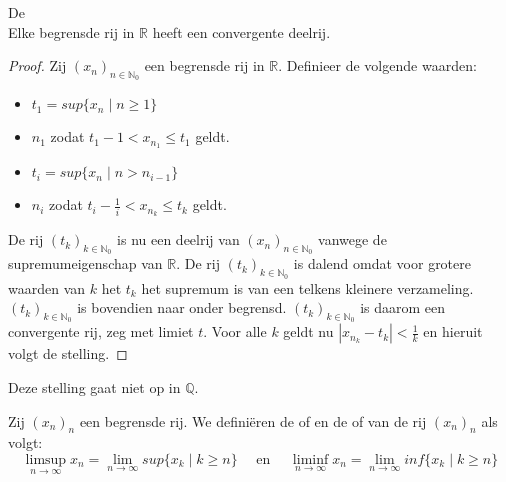 \documentclass[main.tex]{subfiles}
\begin{document}
\begin{bst}
  \label{st:bolzano-rijen}
  De \\
  Elke begrensde rij in $\mathbb{R}$ heeft een convergente deelrij.

  \begin{proof}
    Zij $(x_{n})_{n\in\mathbb{N}_{0}}$ een begrensde rij in $\mathbb{R}$.
    Definieer de volgende waarden:
    \begin{itemize}
    \item $t_{1} = sup\{ x_{n} \mid n \ge 1 \}$
    \item $n_{1}$ zodat $t_1-1 < x_{n_{1}} \le t_{1}$ geldt.
    \item $t_{i} = sup\{ x_{n} \mid n > n_{i-1} \}$
    \item $n_{i}$ zodat $t_{i}-\frac{1}{i} < x_{n_{k}} \le t_{k}$ geldt.
    \end{itemize}
    De rij $(t_{k})_{k\in \mathbb{N}_{0}}$ is nu een deelrij van $(x_{n})_{n\in\mathbb{N}_{0}}$ vanwege de supremumeigenschap van $\mathbb{R}$.\needed
    De rij $(t_{k})_{k\in \mathbb{N}_{0}}$ is dalend omdat voor grotere waarden van $k$ het $t_{k}$ het supremum is van een telkens kleinere verzameling.
    $(t_{k})_{k\in \mathbb{N}_{0}}$ is bovendien naar onder begrensd.\waarom
    $(t_{k})_{k\in \mathbb{N}_{0}}$ is daarom een convergente rij, zeg met limiet $t$.
    Voor alle $k$ geldt nu $|x_{n_{k}} -t_{k}| < \frac{1}{k}$ en hieruit volgt de stelling.
  \end{proof}
\end{bst}

\begin{opm}
  Deze stelling gaat niet op in $\mathbb{Q}$.
\end{opm}

\begin{de}
  Zij $(x_{n})_{n}$ een begrensde rij.
  We defini\"eren de  of  en de  of  van de rij $(x_{n})_{n}$ als volgt:
  \[ \limsup_{n\rightarrow \infty} x_{n} = \lim_{n\rightarrow \infty} sup\{x_{k}\mid k\ge n\} \quad\text{ en }\quad \liminf_{n\rightarrow \infty} x_{n} = \lim_{n\rightarrow \infty} inf\{ x_{k}\mid k\ge n\} \]
\end{de}

\end{document}
